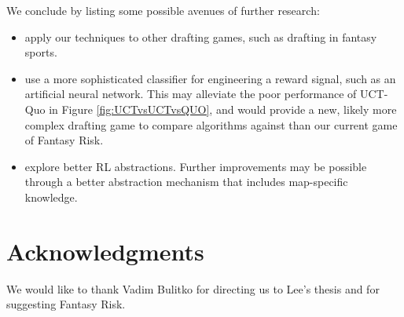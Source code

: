 \documentclass[letterpaper]{article}
\numberwithin{equation}{section}
\numberwithin{theorem}{section}
\numberwithin{lemma}{section}
\numberwithin{df}{section}
\begin{document}
We conclude by listing some possible avenues of further research:
\begin{itemize} %
	\item apply our techniques to other drafting games, such as drafting in fantasy sports.  %
	\item use a more sophisticated classifier for engineering a reward signal, such as an artificial neural network.  This may alleviate the poor performance of UCT-Quo in Figure \ref{fig:UCTvsUCTvsQUO}, and would provide a new, likely more complex drafting game to compare algorithms against than our current game of Fantasy Risk.
	\item explore better RL abstractions.  Further improvements may be possible through a better abstraction mechanism that includes map-specific knowledge.
\end{itemize}

\section*{Acknowledgments}
We would like to thank Vadim Bulitko for directing us to Lee's thesis and for suggesting Fantasy Risk.  %

%
%


\end{document}
